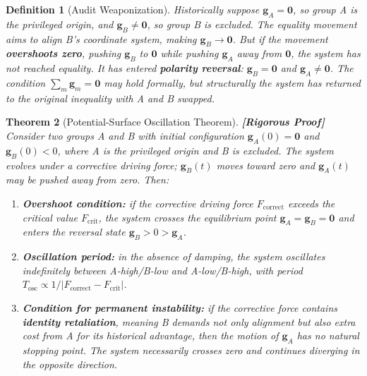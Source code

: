 \documentclass[12pt,a4paper]{article}
\newtheorem{theorem}{Theorem}[section]
\newtheorem{definition}[theorem]{Definition}
\theoremstyle{remark}
\newcommand{\rigorFull}{\textnormal{\textbf{[Rigorous Proof]}}}
\begin{document}
\begin{definition}[Audit Weaponization]\label{def:audit_weaponization}
Historically suppose $\mathbf{g}_A = \mathbf{0}$, so group A is the privileged origin, and $\mathbf{g}_B \neq \mathbf{0}$, so group B is excluded. The equality movement aims to align B's coordinate system, making $\mathbf{g}_B \to \mathbf{0}$. But if the movement \textbf{overshoots zero}, pushing $\mathbf{g}_B$ to $\mathbf{0}$ while pushing $\mathbf{g}_A$ away from $\mathbf{0}$, the system has not reached equality. It has entered \textbf{polarity reversal}: $\mathbf{g}_B = \mathbf{0}$ and $\mathbf{g}_A \neq \mathbf{0}$. The condition $\sum_m \mathbf{g}_m = \mathbf{0}$ may hold formally, but structurally the system has returned to the original inequality with A and B swapped.
\end{definition}

\begin{theorem}[Potential-Surface Oscillation Theorem]\label{thm:oscillation}\rigorFull
Consider two groups A and B with initial configuration $\mathbf{g}_A(0) = \mathbf{0}$ and $\mathbf{g}_B(0) < 0$, where A is the privileged origin and B is excluded. The system evolves under a corrective driving force; $\mathbf{g}_B(t)$ moves toward zero and $\mathbf{g}_A(t)$ may be pushed away from zero. Then:
\begin{enumerate}[label=(\roman*)]
    \item \textbf{Overshoot condition:} if the corrective driving force $F_{\text{correct}}$ exceeds the critical value $F_{\text{crit}}$, the system crosses the equilibrium point $\mathbf{g}_A = \mathbf{g}_B = \mathbf{0}$ and enters the reversal state $\mathbf{g}_B > 0 > \mathbf{g}_A$.
    \item \textbf{Oscillation period:} in the absence of damping, the system oscillates indefinitely between A-high/B-low and A-low/B-high, with period $T_{\text{osc}} \propto 1/|F_{\text{correct}} - F_{\text{crit}}|$.
    \item \textbf{Condition for permanent instability:} if the corrective force contains \textbf{identity retaliation}, meaning B demands not only alignment but also extra cost from A for its historical advantage, then the motion of $\mathbf{g}_A$ has no natural stopping point. The system necessarily crosses zero and continues diverging in the opposite direction.
\end{enumerate}
\end{theorem}
\end{document}
